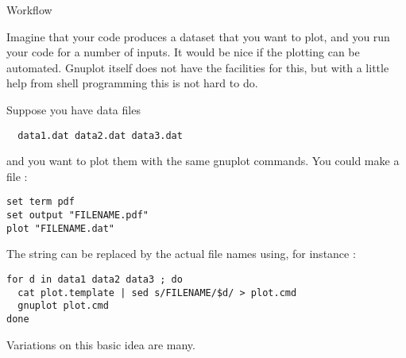  {Workflow}

Imagine that your code produces a dataset that you want to plot, and
you run your code for a number of inputs. It would be nice if the
plotting can be automated. Gnuplot itself does not have the facilities
for this, but with a little help from shell programming this is not
hard to do.

Suppose you have data files
\begin{verbatim}
  data1.dat data2.dat data3.dat
\end{verbatim}
and you want to plot them with the same gnuplot commands. You could
make a file :
\begin{verbatim}
set term pdf
set output "FILENAME.pdf"
plot "FILENAME.dat"
\end{verbatim}
The string  can be replaced by the actual file names
using, for instance :
\begin{verbatim}
for d in data1 data2 data3 ; do
  cat plot.template | sed s/FILENAME/$d/ > plot.cmd
  gnuplot plot.cmd
done
\end{verbatim}
Variations on this basic idea are many.

